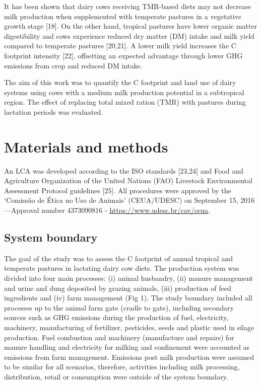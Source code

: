 \documentclass[11pt,a4paper]{article}
\begin{document}
It has been shown that dairy cows receiving TMR-based diets may not decrease milk production when supplemented with temperate pastures in a vegetative growth stage [18]. On the other hand, tropical pastures have lower organic matter digestibility and cows experience reduced dry matter (DM) intake and milk yield compared to temperate pastures [20,21]. A lower milk yield increases the C footprint intensity [22], offsetting an expected advantage through lower GHG emissions from crop and reduced DM intake.

The aim of this work was to quantify the C footprint and land use of dairy systems using cows with a medium milk production potential in a subtropical region. The effect of replacing total mixed ration (TMR) with pastures during lactation periods was evaluated.

\section{Materials and methods}

An LCA was developed according to the ISO standards [23,24] and Food and Agriculture Organization of the United Nations (FAO) Livestock Environmental Assessment Protocol guidelines [25]. All procedures were approved by the ‘Comissão de Ética no Uso de Animais’ (CEUA/UDESC) on September 15, 2016—Approval number 4373090816 - \href{https://www.udesc.br/cav/ceua}{https://www.udesc.br/cav/ceua}.

\subsection{System boundary}

The goal of the study was to assess the C footprint of annual tropical and temperate pastures in lactating dairy cow diets. The production system was divided into four main processes: (i) animal husbandry, (ii) manure management and urine and dung deposited by grazing animals, (iii) production of feed ingredients and (iv) farm management (Fig 1). The study boundary included all processes up to the animal farm gate (cradle to gate), including secondary sources such as GHG emissions during the production of fuel, electricity, machinery, manufacturing of fertilizer, pesticides, seeds and plastic used in silage production. Fuel combustion and machinery (manufacture and repairs) for manure handling and electricity for milking and confinement were accounted as emissions from farm management. Emissions post milk production were assumed to be similar for all scenarios, therefore, activities including milk processing, distribution, retail or consumption were outside of the system boundary.
\end{document}
